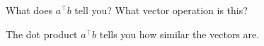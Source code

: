 What does $a^\intercal b$ tell you? What vector operation is this?

\begin{solution}
    The dot product $a^\intercal b$ tells you how similar the vectors are.
\end{solution}